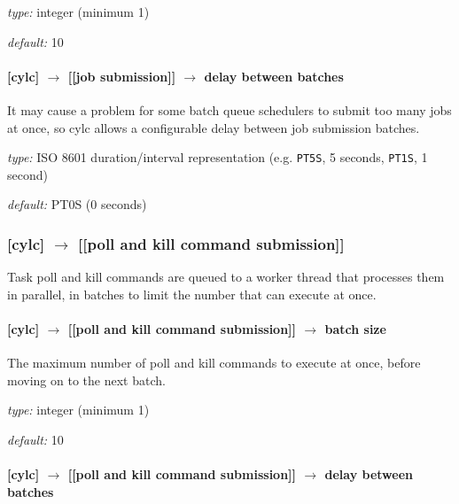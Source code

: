 \begin{myitemize}
    \item {\em type:} integer (minimum 1)
    \item {\em default:} 10
\end{myitemize}

\paragraph[delay between batches]{[cylc] $\rightarrow$ [[job submission]] $\rightarrow$ delay between batches}

It may cause a problem for some batch queue schedulers to submit too
many jobs at once, so cylc allows a configurable delay between job
submission batches.

\begin{myitemize}
    \item {\em type:} ISO 8601 duration/interval representation (e.g.
 \lstinline=PT5S=, 5 seconds, \lstinline=PT1S=, 1 second)
    \item {\em default:} PT0S (0 seconds)
\end{myitemize}

\subsubsection[{[[}poll and kill command submission{]]}]{[cylc] $\rightarrow$ [[poll and kill command submission]]}

Task poll and kill commands are queued to a worker thread that processes
them in parallel, in batches to limit the number that can execute at
once.

\paragraph[batch size]{[cylc] $\rightarrow$ [[poll and kill command submission]] $\rightarrow$ batch size}

The maximum number of poll and kill commands to execute at once, before
moving on to the next batch.

\begin{myitemize}
    \item {\em type:} integer (minimum 1)
    \item {\em default:} 10
\end{myitemize}

\paragraph[delay between batches]{[cylc] $\rightarrow$ [[poll and kill command submission]] $\rightarrow$ delay between batches}

